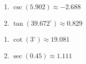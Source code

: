 \begin{multicols}{2}

\begin{enumerate}

\setcounter{enumi}{\value{HW}}

\item $\csc(5.902) \approx -2.688$
\item $\tan(39.672^{\circ}) \approx 0.829$

\setcounter{HW}{\value{enumi}}

\end{enumerate}

\end{multicols}

\begin{multicols}{2}

\begin{enumerate}

\setcounter{enumi}{\value{HW}}

\item $\cot(3^{\circ}) \approx 19.081$
\item $\sec(0.45) \approx 1.111$

\setcounter{HW}{\value{enumi}}

\end{enumerate}

\end{multicols}

